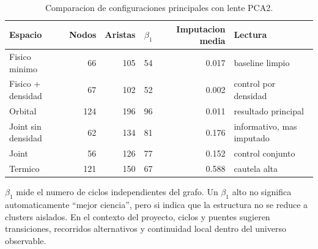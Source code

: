 \documentclass[11pt]{article}
\begin{document}
\begin{table}[H]
\centering
\caption{Comparacion de configuraciones principales con lente PCA2.}
\begin{tabular}{lrrrrl}
\toprule
Espacio & Nodos & Aristas & \(\beta_1\) & Imputacion media & Lectura \\
\midrule
Fisico minimo & 66 & 105 & 54 & 0.017 & baseline limpio \\
Fisico + densidad & 67 & 102 & 52 & 0.002 & control por densidad \\
Orbital & 124 & 196 & 96 & 0.011 & resultado principal \\
Joint sin densidad & 62 & 134 & 81 & 0.176 & informativo, mas imputado \\
Joint & 56 & 126 & 77 & 0.152 & control conjunto \\
Termico & 121 & 150 & 67 & 0.588 & cautela alta \\
\bottomrule
\end{tabular}
\end{table}

\(\beta_1\) mide el numero de ciclos independientes del grafo. Un \(\beta_1\) alto no significa automaticamente ``mejor ciencia'', pero si indica que la estructura no se reduce a clusters aislados. En el contexto del proyecto, ciclos y puentes sugieren transiciones, recorridos alternativos y continuidad local dentro del universo observable.
\end{document}
